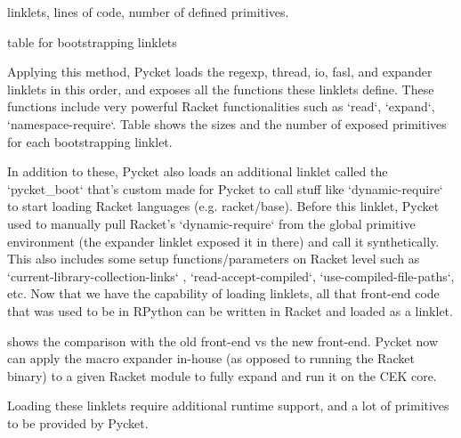 		\begin{table-here}
			linklets, lines of code, number of defined primitives.

			\begin{todo}
				table for bootstrapping linklets
			\end{todo}
		\end{table-here}

		\begin{paragraph-here}%
			Applying this method, Pycket loads the regexp, thread, io, fasl, and expander linklets in this order, and exposes all the functions these linklets define. These functions include very powerful Racket functionalities such as `read`, `expand`, `namespace-require`. Table shows the sizes and the number of exposed primitives for each bootstrapping linklet.
		\end{paragraph-here}

		\begin{paragraph-here}%
			In addition to these, Pycket also loads an additional linklet called the `pycket\_boot` that's custom made for Pycket to call stuff like `dynamic-require` to start loading Racket languages (e.g. racket/base). Before this linklet, Pycket used to manually pull Racket's `dynamic-require` from the global primitive environment (the expander linklet exposed it in there) and call it synthetically. This also includes some setup functions/parameters on Racket level such as `current-library-collection-links` , `read-accept-compiled`, `use-compiled-file-paths`, etc. Now that we have the capability of loading linklets, all that front-end code that was used to be in RPython can be written in Racket and loaded as a linklet.
		\end{paragraph-here}


		\begin{paragraph-here}%
			  shows the comparison with the old front-end vs the new front-end. Pycket now can apply the macro expander in-house (as opposed to running the Racket binary) to a given Racket module to fully expand and run it on the CEK core.
		\end{paragraph-here}

		\begin{paragraph-here}%
			Loading these linklets require additional runtime support, and a lot of primitives to be provided by Pycket.
		\end{paragraph-here}

